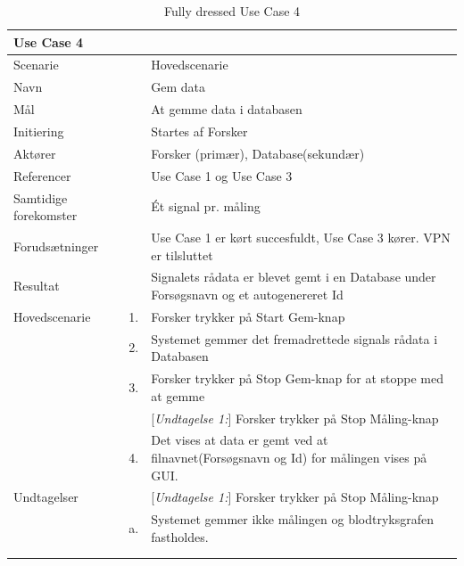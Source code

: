 \begin{longtabu} to  %
    {\large \textbf{Use Case 4}} && \\
    \toprule
    Scenarie && Hovedscenarie\\
    Navn && Gem data\\
    Mål && At gemme data i databasen\\
    Initiering && Startes af Forsker\\
    Aktører && Forsker (primær), Database(sekundær)\\
    Referencer && Use Case 1 og Use Case 3 \\
    Samtidige forekomster  &&  Ét signal pr. måling\\
    Forudsætninger && Use Case 1 er kørt succesfuldt, Use Case 3 kører. VPN er tilsluttet\\
    Resultat && Signalets rådata er blevet gemt i en Database under Forsøgsnavn og et autogenereret Id\\ \midrule
    Hovedscenarie &    1. &		Forsker trykker på Start Gem-knap\\[-1ex] 
    &	2. & Systemet gemmer det fremadrettede signals rådata i Databasen\\
                  &    3. &  Forsker trykker på Stop Gem-knap for at stoppe med at gemme\\
    &	&			[\textit{Undtagelse 1:}] Forsker trykker på Stop Måling-knap\\
                    &    4. &   Det vises at data er gemt ved at filnavnet(Forsøgsnavn og Id) for målingen vises på GUI. \\ \midrule	 	
 Undtagelser &    & [\textit{Undtagelse 1:}] Forsker trykker på Stop Måling-knap\\
 & a. 	&  Systemet gemmer ikke målingen og blodtryksgrafen fastholdes.\\  

 \\ \bottomrule
\caption{Fully dressed Use Case 4}
\label{UC4}
\end{longtabu}

